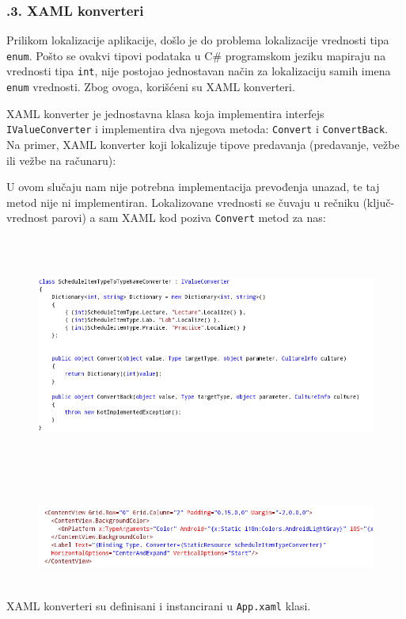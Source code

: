 \documentclass[a4paper]{article}
\begin{document}
\subsubsection[7.8.3. XAML konverteri]{.3. XAML konverteri}
\hypertarget{RefHeadingToc866882405265}{}Prilikom lokalizacije
aplikacije, došlo je do problema lokalizacije vrednosti tipa
\texttt{\textcolor[rgb]{0.0,0.4,0.8}{enum}}. Pošto se ovakvi tipovi
podataka u C\# programskom jeziku mapiraju na vrednosti tipa
\texttt{\textcolor[rgb]{0.0,0.4,0.8}{int}}, nije postojao jednostavan
način za lokalizaciju samih imena
\texttt{\textcolor[rgb]{0.0,0.4,0.8}{enum}} vrednosti. Zbog ovoga,
korišćeni su XAML konverteri.

XAML konverter je jednostavna klasa koja implementira interfejs
\texttt{\textcolor[rgb]{0.0,0.4,0.8}{IValueConverter}} i implementira
dva njegova metoda: \texttt{\textcolor[rgb]{0.0,0.4,0.8}{Convert}} i
\texttt{\textcolor[rgb]{0.0,0.4,0.8}{ConvertBack}}. Na primer, XAML
konverter koji lokalizuje tipove predavanja (predavanje, vežbe ili
vežbe na računaru):

U ovom slučaju nam nije potrebna implementacija prevođenja unazad, te
taj metod nije ni implementiran. Lokalizovane vrednosti se čuvaju u
rečniku (ključ-vrednost parovi) a sam XAML kod poziva
\texttt{\textcolor[rgb]{0.0,0.4,0.8}{Convert}} metod za nas:

\begin{figure}
\centering
\includegraphics[width=170mm,height=79.15mm]{msc-img63.png}
\end{figure}


\begin{figure}
\centering
\includegraphics[width=170mm,height=31.59mm]{msc-img64.png}
\end{figure}
XAML konverteri su definisani i instancirani u
\texttt{\textcolor[rgb]{0.0,0.4,0.8}{App.xaml}} klasi. 
\end{document}
